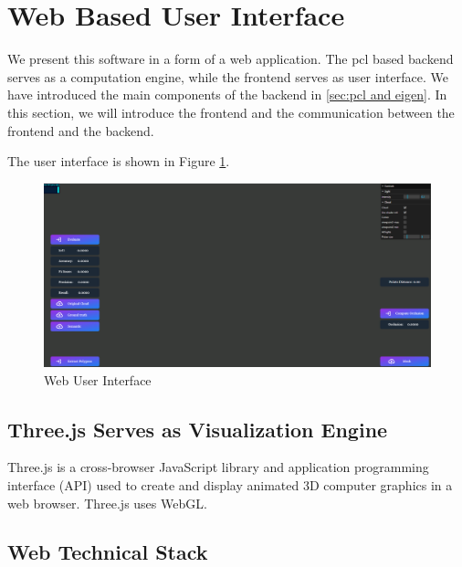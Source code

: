 \documentclass[11pt, a4paper,oneside,chapterprefix=false]{scrbook}
\begin{document}
\section{Web Based User Interface} \label{sec:three.js}

We present this software in a form of a web application. The pcl based backend serves as a computation engine, while the frontend serves as user interface. We have introduced the main components of the backend in \ref{sec:pcl and eigen}. In this section, we will introduce the frontend and the communication between the frontend and the backend. 

The user interface is shown in Figure \ref{fig:web user interface}. 

\noindent
\begin{minipage}{\textwidth}
	\begin{figure}[H]
		\includegraphics*[width=1.0\textwidth]{figures/ui.png}
		\caption{Web User Interface }
		\label{fig:web user interface}
	\end{figure}
\end{minipage}

\subsection{Three.js Serves as Visualization Engine}

Three.js is a cross-browser JavaScript library and application programming interface (API) used to create and display animated 3D computer graphics in a web browser. Three.js uses WebGL.

\subsection{Web Technical Stack}
\end{document}
